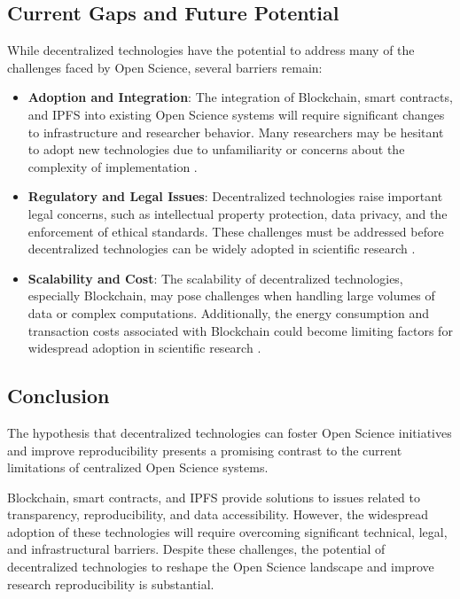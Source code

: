 \documentclass{article}
\begin{document}
\subsection{Current Gaps and Future Potential}
While decentralized technologies have the potential to address many of the challenges faced by Open Science, several barriers remain:
\begin{itemize}
    \item \textbf{Adoption and Integration}: The integration of Blockchain, smart contracts, and IPFS into existing Open Science systems will require significant changes to infrastructure and researcher behavior. Many researchers may be hesitant to adopt new technologies due to unfamiliarity or concerns about the complexity of implementation \cite{Leonelli2016}.
    \item \textbf{Regulatory and Legal Issues}: Decentralized technologies raise important legal concerns, such as intellectual property protection, data privacy, and the enforcement of ethical standards. These challenges must be addressed before decentralized technologies can be widely adopted in scientific research \cite{Borgman2012}.
    \item \textbf{Scalability and Cost}: The scalability of decentralized technologies, especially Blockchain, may pose challenges when handling large volumes of data or complex computations. Additionally, the energy consumption and transaction costs associated with Blockchain could become limiting factors for widespread adoption in scientific research \cite{Boulton2015}.
\end{itemize}

\subsection{Conclusion}
The hypothesis that decentralized technologies can foster Open Science initiatives and improve reproducibility presents a promising contrast to the current limitations of centralized Open Science systems. 

Blockchain, smart contracts, and IPFS provide solutions to issues related to transparency, reproducibility, and data accessibility. However, the widespread adoption of these technologies will require overcoming significant technical, legal, and infrastructural barriers. Despite these challenges, the potential of decentralized technologies to reshape the Open Science landscape and improve research reproducibility is substantial.



\end{document}
